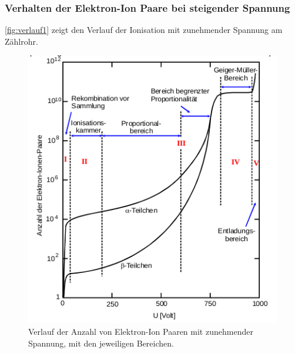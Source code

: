 \subsubsection{Verhalten der Elektron-Ion Paare bei steigender Spannung}
\autoref{fig:verlauf1} zeigt den Verlauf der Ionisation mit zunehmender Spannung am Zählrohr.

\begin{figure}[htbp]
    \centering
    \includegraphics[scale=0.7]{Pics/verlauf.png}
    \caption{Verlauf der Anzahl von Elektron-Ion Paaren mit zunehmender Spannung, mit den jeweiligen Bereichen.}
    \label{fig:verlauf1}
\end{figure}

